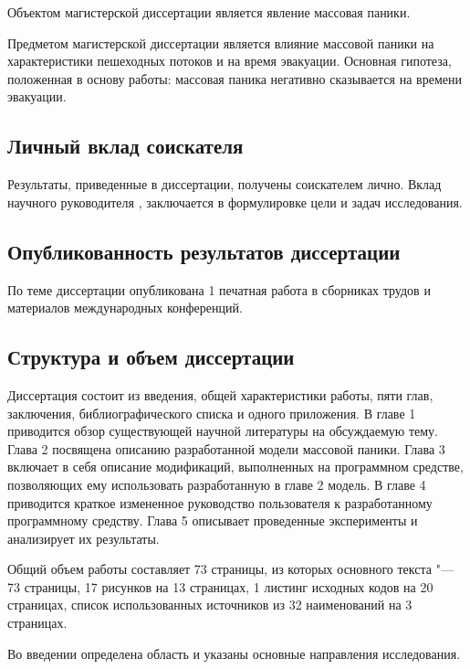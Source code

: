 Объектом магистерской диссертации является явление массовая паники.

Предметом магистерской диссертации является влияние массовой паники на характеристики пешеходных потоков и на время эвакуации.
Основная гипотеза, положенная в основу работы: массовая паника негативно сказывается на времени эвакуации.

\subsection*{\textbf{Личный вклад соискателя}}

Результаты, приведенные в диссертации, получены соискателем лично.
Вклад научного руководителя \mastersCharSupervisor, заключается в формулировке цели и задач исследования.

\subsection*{\textbf{Опубликованность результатов диссертации}}

По теме диссертации опубликована 1 печатная работа в сборниках трудов и материалов международных конференций.

\subsection*{\textbf{Структура и объем диссертации}}

Диссертация состоит из введения, общей характеристики работы, пяти глав, заключения, библиографического списка и одного приложения.
В главе 1 приводится обзор существующей научной литературы на обсуждаемую тему. Глава 2 посвящена описанию разработанной модели массовой паники.
Глава 3 включает в себя описание модификаций, выполненных на программном средстве, позволяющих ему использовать разработанную в главе 2 модель.
В главе 4 приводится краткое измененное руководство пользователя к разработанному программному средству.
Глава 5 описывает проведенные эксперименты и анализирует их результаты.

Общий объем работы составляет 73 страницы, из которых основного текста "--- 73 страницы, 17 рисунков на 13 страницах, 1 листинг исходных кодов на 20 страницах,
список использованных источников из 32 наименований на 3 страницах.



Во введении определена область и указаны основные направления исследования.

